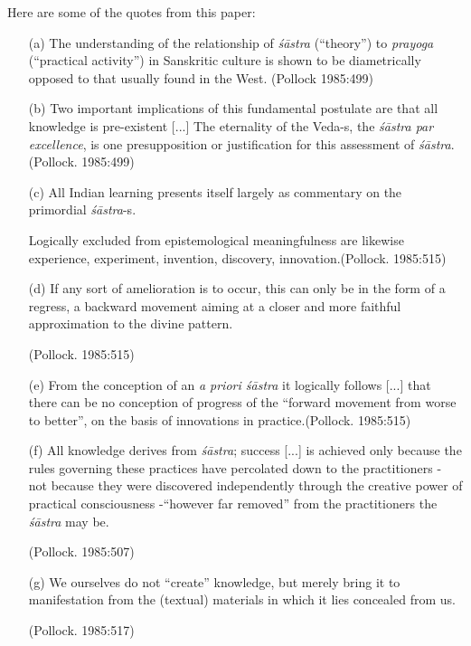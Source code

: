Here are some of the quotes from this paper:
\begin{itemize}
\item[(a)] The understanding of the relationship of {\sl śāstra} (``theory'') to {\sl prayoga} (``practical activity'') in Sanskritic culture is shown to be diametrically opposed to that usually found in the West. (Pollock 1985:499)

\item[(b)] Two important implications of this fundamental postulate are that all knowledge is pre-existent [...] The eternality of the Veda-s, the {\sl śāstra par excellence}, is one presupposition or justification for this assessment of {\sl śāstra}.\hfill (Pollock. 1985:499)

\item[(c)] All Indian learning presents itself largely as commentary on the primordial {\sl śāstra}-s.

Logically excluded from epistemological meaningfulness are likewise experience, experiment, invention, discovery, innovation.\hfill (Pollock. 1985:515)

\item[(d)] If any sort of amelioration is to occur, this can only be in the form of a regress, a backward movement aiming at a closer and more faithful approximation to the divine pattern.

\hfill (Pollock. 1985:515)

\item[(e)] From the conception of an {\sl a priori śāstra} it logically follows [...] that there can be no conception of progress of the ``forward movement from worse to better'', on the basis of innovations in practice.\hfill (Pollock. 1985:515)

\item[(f)] All knowledge derives from {\sl śāstra}; success [...] is achieved only because the rules governing these practices have percolated down to the practitioners - not because they were discovered independently through the creative power of practical consciousness -``however far removed'' from the practitioners the {\sl śāstra} may be.

\hfill (Pollock. 1985:507)

\item[(g)] We ourselves do not ``create'' knowledge, but merely bring it to manifestation from the (textual) materials in which it lies concealed from us.

\hfill (Pollock. 1985:517) 
\end{itemize}

